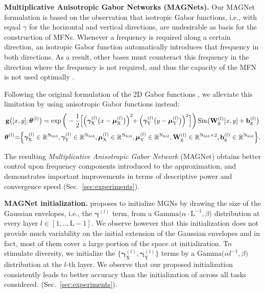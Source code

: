 \documentclass{article} \usepackage{iclr2022_conference,times}
\def\sR{{\mathbb{R}}}
\newcommand{\mat}[1]{\ensuremath{{\mathbf{\MakeUppercase{{#1}}}}}}
\newcommand{\Wm}{\mat{W}}
\def\Nt{\mathrm{N}}
\def\Xt{\mathrm{X}}
\def\Yt{\mathrm{Y}}
\def\sR{{\mathbb{R}}}
\begin{document}
\textbf{Multiplicative Anisotropic Gabor Networks (MAGNets).} Our MAGNet formulation is based on the observation that isotropic Gabor functions, i.e., with equal $\gamma$ for the horizontal and vertical directions, are undesirable as basis for the construction of MFNs. Whenever a frequency is required along a certain direction, an isotropic Gabor function automatically introduces that frequency in both directions. As a result, other bases must counteract this frequency in the direction where the frequency is not required, and thus the capacity of the MFN is not used optimally \citep{daugman1988complete}. 

Following the original formulation of the 2D Gabor functions \citep{daugman1988complete}, we alleviate this limitation by using anisotropic Gabor functions instead:\vspace{-0.5mm}
\begin{gather}
    \label{eq:anisotropicgaussian}
    \boldsymbol{\mathrm{g}}\big( [x,y] ; \boldsymbol{\theta}^{(l)}\big) = \exp \bigg(-\frac{1}{2} \Big[\Big(\boldsymbol{\gamma}^{(l)}_\mathrm{X}\big(x - \boldsymbol{\mu}_\mathrm{X}^{(l)}\big)\Big)^2 \hspace{-1mm}+ \Big(\boldsymbol{\gamma}_\mathrm{Y}^{(l)}\big(y - \boldsymbol{\mu}_\mathrm{Y}^{(l)}\big)\Big)^2\Big] \bigg)\, \mathrm{Sin} \big(\Wm_\mathrm{g}^{(l)} [x, y] + \boldsymbol{\mathrm{b}}_\mathrm{g}^{(l)} \big)\\
    \boldsymbol{\theta}^{(l)} {=} \Big\{ \boldsymbol{\gamma}_{\Xt}^{(l)}\in \sR^{\Nt_{\mathrm{hid}}}, \boldsymbol{\gamma}_{\Yt}^{(l)}\in \sR^{\Nt_{\mathrm{hid}}}, \boldsymbol{\mu}_{\Xt}^{(l)}\in \sR^{\Nt_{\mathrm{hid}}}, \boldsymbol{\mu}_{\Yt}^{(l)}\in \sR^{\Nt_{\mathrm{hid}} },\Wm_\mathrm{g}^{(l)}\in \sR^{\Nt_{\mathrm{hid}} \times 2}, \boldsymbol{\mathrm{b}}_\mathrm{g}^{(l)}\in \sR^{\Nt_{\mathrm{hid}}} \Big\}.\label{eq:params_anisotropicgaussian}
\end{gather}
\vspace{-5.5mm}

The resulting \textit{Multiplicative Anisotropic Gabor Network} (MAGNet) obtains better control upon frequency components introduced to the approximation, and demonstrates important improvements in terms of descriptive power and convergence speed (Sec.~\ref{sec:experiments}).

\textbf{MAGNet initialization.} \citet{fathony2021multiplicative} proposes to initialize MGNs by drawing the size of the Gaussian envelopes, i.e., the $\boldsymbol{\gamma}^{(l)}$ term, from a $\mathrm{Gamma(}\alpha \cdot \mathrm{L}^{-1}, \beta{\mathrm{)}}$ distribution at every layer $l \in [1, .., \mathrm{L}-1]$. We observe however that this initialization does not provide much variability on the initial extension of the Gaussian envelopes and in fact, most of them cover a large portion of the space at initialization.
To stimulate diversity, we initialize the $\{\boldsymbol{\gamma}_{\Xt}^{(l)}, \boldsymbol{\gamma}_{\Yt}^{(l)}\}$ terms by a $\mathrm{Gamma(}\alpha l^{-1}, \beta{\mathrm{)}}$ distribution at the $l$-th layer. We observe that our proposed initialization consistently leads to better accuracy than the initialization of \cite{fathony2021multiplicative} across all tasks considered. (Sec.~\ref{sec:experiments}).
\vspace{-1mm}
\end{document}
